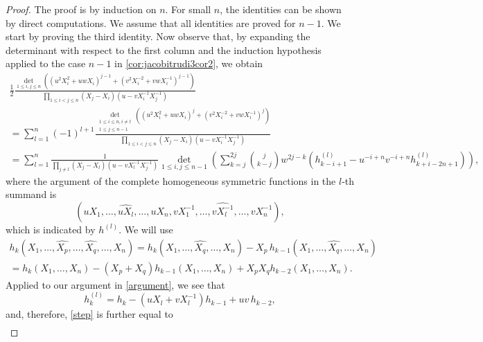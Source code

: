 \documentclass[12pt]{amsart}
\theoremstyle{definition}
\numberwithin{equation}{section}
\begin{document}
	\begin{proof} 
		The proof is by induction on $n$. For small $n$, the identities can be shown by direct computations. We assume that 
		all identities are proved for $n-1$. 
		We start by proving the third identity. Now observe that, by expanding the determinant with respect to the first column and the induction 
		hypothesis applied to the case $n-1$ in \eqref{cor:jacobitrudi3cor2}, we obtain
		\begin{multline} 
			\label{step}
			\frac{1}{2}  \frac{\det_{1 \le i,j \le n} \left( \left(u^2 X_i^2 + u w X_i\right)^{j-1} + \left(v^2 X_i^{-2} + v w X_i^{-1}\right)^{j-1} \right)}
			{\prod_{1 \le i < j \le n} (X_j-X_i)(u - v X_i^{-1} X_j^{-1})} \\
			= \sum_{l=1}^n (-1)^{l+1} 
			\frac{\det_{\substack{1 \le i \le  n, i \not=l  \\ 1 \le j \le n-1}}
				\left( \left(u^2 X_i^2 + u w X_i\right)^{j} + \left(v^2 X_i^{-2} + v w X_i^{-1}\right)^{j} \right)}
			{\prod_{1 \le i < j \le n} (X_j-X_i)(u - v X_i^{-1} X_j^{-1})} \\
			= \sum_{l=1}^n \frac{1}{\prod_{j \not= l} (X_j-X_l)(u-v X_l^{-1} X_j^{-1})} 
			\det_{1 \le i, j \le n-1} \left( \sum_{k=j}^{2j} \binom{j}{k-j} w^{2j-k}  \left( h^{(l)}_{k-i+1} - u^{-i+n} v^{-i+n} h^{(l)}_{k+i-2n+1} \right) \right), 
		\end{multline} 
		where the argument of the complete homogeneous symmetric functions in the $l$-th summand is 
		\begin{equation}
			\label{argument}
			(u X_1,\ldots,\widehat{u X_l},\ldots,u X_n,v X_1^{-1},\ldots,\widehat{v X_l^{-1}},\ldots,v X_n^{-1}),
		\end{equation} 
		which is indicated by $h^{(l)}$. We will use 
		\begin{multline*} 
			h_k(X_1,\ldots,\widehat{X_p},\ldots,\widehat{X_q},\ldots,X_n) = h_k(X_1,\ldots,\widehat{X_q},\ldots,X_n) - X_p \, h_{k-1}(X_1,\ldots,\widehat{X_q},\ldots,X_n) \\
			= h_k(X_1,\ldots,X_n) - (X_p+X_q) h_{k-1}(X_1,\ldots,X_n) + X_p X_q h_{k-2}(X_1,\ldots,X_n).
		\end{multline*} 
		Applied to our argument in \eqref{argument}, we see that 
		\begin{equation*}
		h_k^{(l)}= h_k - (u X_l + v X_l^{-1}) h_{k-1} + u v\,  h_{k-2},
		\end{equation*}
		and, therefore, \eqref{step} is further equal to 
		\begin{multline}
			\label{eq:splittedhsum}

\end{multline}
\end{proof}
\end{document}
